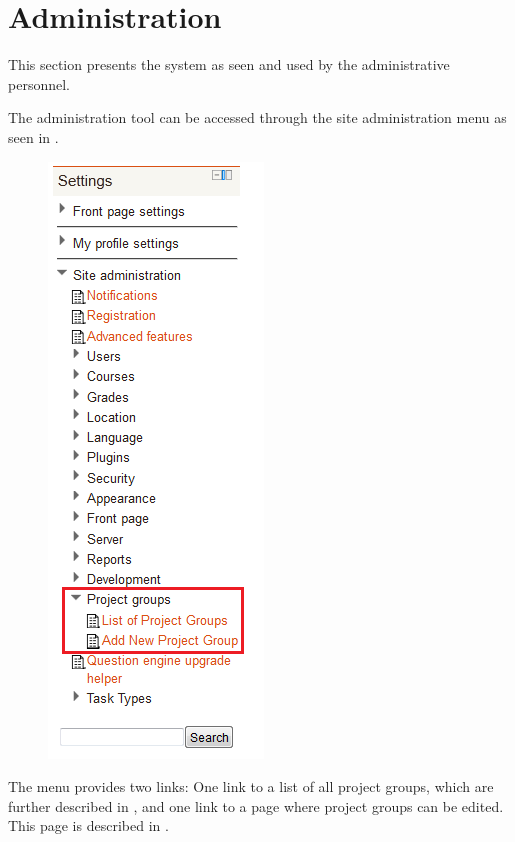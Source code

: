 \FloatBarrier
\section{Administration}
\label{sec:adminPrensentation}
This section presents the system as seen and used by the administrative personnel.

The administration tool can be accessed through the site administration menu as seen in .

\begin{figure}[htb]
	\centering
		\includegraphics[scale=0.6]{images/admin-navigation.png}
	\label{fig:navigation}
\end{figure}
The menu provides two links: One link to a list of all project groups, which are further described in , and one link to a page where project groups can be edited. 
This page is described in .


\FloatBarrier

